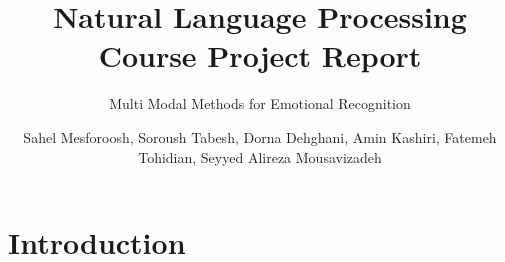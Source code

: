 \documentclass[sigconf]{acmart}
\begin{document}
\title{Natural Language Processing Course Project Report}
\subtitle{Multi Modal Methods for Emotional Recognition}

\author{Sahel Mesforoosh, Soroush Tabesh, Dorna Dehghani, Amin Kashiri, Fatemeh Tohidian, Seyyed Alireza Mousavizadeh}




\begin{abstract}

\end{abstract}


\maketitle


\section{Introduction}
\label{sec:introduction}


%

%

%
%
%
%
%
%
%

%



\end{document}

